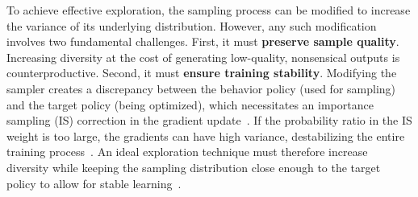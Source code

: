 To achieve effective exploration, the sampling process can be modified to increase the variance of its underlying distribution.
However, any such modification involves two fundamental challenges.
First, it must \textbf{preserve sample quality}. 
Increasing diversity at the cost of generating low-quality, nonsensical outputs is counterproductive.
Second, it must \textbf{ensure training stability}.
Modifying the sampler creates a discrepancy between the behavior policy (used for sampling) and the target policy (being optimized), which necessitates an importance sampling (IS) correction in the gradient update~\citep{degris2012off}.
If the probability ratio in the IS weight is too large, the gradients can have high variance, destabilizing the entire training process~\citep{schulman2017proximal}.
An ideal exploration technique must therefore increase diversity while keeping the sampling distribution close enough to the target policy to allow for stable learning~\citep{haarnoja2018soft, ziegler2019fine}.

